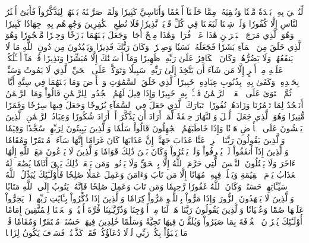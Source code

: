 لِّنُحۡـِۧيَ بِهِۦ بَلۡدَةٗ مَّيۡتٗا وَنُسۡقِيَهُۥ مِمَّا خَلَقۡنَآ أَنۡعَٰمٗا وَأَنَاسِيَّ كَثِيرٗا
وَلَقَدۡ صَرَّفۡنَٰهُ بَيۡنَهُمۡ لِيَذَّكَّرُواْ فَأَبَىٰٓ أَكۡثَرُ ٱلنَّاسِ إِلَّا كُفُورٗا
وَلَوۡ شِئۡنَا لَبَعَثۡنَا فِي كُلِّ قَرۡيَةٖ نَّذِيرٗا
فَلَا تُطِعِ ٱلۡكَٰفِرِينَ وَجَٰهِدۡهُم بِهِۦ جِهَادٗا كَبِيرٗا
۞وَهُوَ ٱلَّذِي مَرَجَ ٱلۡبَحۡرَيۡنِ هَٰذَا عَذۡبٞ فُرَاتٞ وَهَٰذَا مِلۡحٌ أُجَاجٞ وَجَعَلَ بَيۡنَهُمَا بَرۡزَخٗا وَحِجۡرٗا مَّحۡجُورٗا
وَهُوَ ٱلَّذِي خَلَقَ مِنَ ٱلۡمَآءِ بَشَرٗا فَجَعَلَهُۥ نَسَبٗا وَصِهۡرٗاۗ وَكَانَ رَبُّكَ قَدِيرٗا
وَيَعۡبُدُونَ مِن دُونِ ٱللَّهِ مَا لَا يَنفَعُهُمۡ وَلَا يَضُرُّهُمۡۗ وَكَانَ ٱلۡكَافِرُ عَلَىٰ رَبِّهِۦ ظَهِيرٗا
وَمَآ أَرۡسَلۡنَٰكَ إِلَّا مُبَشِّرٗا وَنَذِيرٗا
قُلۡ مَآ أَسۡـَٔلُكُمۡ عَلَيۡهِ مِنۡ أَجۡرٍ إِلَّا مَن شَآءَ أَن يَتَّخِذَ إِلَىٰ رَبِّهِۦ سَبِيلٗا
وَتَوَكَّلۡ عَلَى ٱلۡحَيِّ ٱلَّذِي لَا يَمُوتُ وَسَبِّحۡ بِحَمۡدِهِۦۚ وَكَفَىٰ بِهِۦ بِذُنُوبِ عِبَادِهِۦ خَبِيرًا
ٱلَّذِي خَلَقَ ٱلسَّمَٰوَٰتِ وَٱلۡأَرۡضَ وَمَا بَيۡنَهُمَا فِي سِتَّةِ أَيَّامٖ ثُمَّ ٱسۡتَوَىٰ عَلَى ٱلۡعَرۡشِۖ ٱلرَّحۡمَٰنُ فَسۡـَٔلۡ بِهِۦ خَبِيرٗا
وَإِذَا قِيلَ لَهُمُ ٱسۡجُدُواْۤ لِلرَّحۡمَٰنِ قَالُواْ وَمَا ٱلرَّحۡمَٰنُ أَنَسۡجُدُ لِمَا تَأۡمُرُنَا وَزَادَهُمۡ نُفُورٗا۩
تَبَارَكَ ٱلَّذِي جَعَلَ فِي ٱلسَّمَآءِ بُرُوجٗا وَجَعَلَ فِيهَا سِرَٰجٗا وَقَمَرٗا مُّنِيرٗا
وَهُوَ ٱلَّذِي جَعَلَ ٱلَّيۡلَ وَٱلنَّهَارَ خِلۡفَةٗ لِّمَنۡ أَرَادَ أَن يَذَّكَّرَ أَوۡ أَرَادَ شُكُورٗا
وَعِبَادُ ٱلرَّحۡمَٰنِ ٱلَّذِينَ يَمۡشُونَ عَلَى ٱلۡأَرۡضِ هَوۡنٗا وَإِذَا خَاطَبَهُمُ ٱلۡجَٰهِلُونَ قَالُواْ سَلَٰمٗا
وَٱلَّذِينَ يَبِيتُونَ لِرَبِّهِمۡ سُجَّدٗا وَقِيَٰمٗا
وَٱلَّذِينَ يَقُولُونَ رَبَّنَا ٱصۡرِفۡ عَنَّا عَذَابَ جَهَنَّمَۖ إِنَّ عَذَابَهَا كَانَ غَرَامًا
إِنَّهَا سَآءَتۡ مُسۡتَقَرّٗا وَمُقَامٗا
وَٱلَّذِينَ إِذَآ أَنفَقُواْ لَمۡ يُسۡرِفُواْ وَلَمۡ يَقۡتُرُواْ وَكَانَ بَيۡنَ ذَٰلِكَ قَوَامٗا
وَٱلَّذِينَ لَا يَدۡعُونَ مَعَ ٱللَّهِ إِلَٰهًا ءَاخَرَ وَلَا يَقۡتُلُونَ ٱلنَّفۡسَ ٱلَّتِي حَرَّمَ ٱللَّهُ إِلَّا بِٱلۡحَقِّ وَلَا يَزۡنُونَۚ وَمَن يَفۡعَلۡ ذَٰلِكَ يَلۡقَ أَثَامٗا
يُضَٰعَفۡ لَهُ ٱلۡعَذَابُ يَوۡمَ ٱلۡقِيَٰمَةِ وَيَخۡلُدۡ فِيهِۦ مُهَانًا
إِلَّا مَن تَابَ وَءَامَنَ وَعَمِلَ عَمَلٗا صَٰلِحٗا فَأُوْلَـٰٓئِكَ يُبَدِّلُ ٱللَّهُ سَيِّـَٔاتِهِمۡ حَسَنَٰتٖۗ وَكَانَ ٱللَّهُ غَفُورٗا رَّحِيمٗا
وَمَن تَابَ وَعَمِلَ صَٰلِحٗا فَإِنَّهُۥ يَتُوبُ إِلَى ٱللَّهِ مَتَابٗا
وَٱلَّذِينَ لَا يَشۡهَدُونَ ٱلزُّورَ وَإِذَا مَرُّواْ بِٱللَّغۡوِ مَرُّواْ كِرَامٗا
وَٱلَّذِينَ إِذَا ذُكِّرُواْ بِـَٔايَٰتِ رَبِّهِمۡ لَمۡ يَخِرُّواْ عَلَيۡهَا صُمّٗا وَعُمۡيَانٗا
وَٱلَّذِينَ يَقُولُونَ رَبَّنَا هَبۡ لَنَا مِنۡ أَزۡوَٰجِنَا وَذُرِّيَّـٰتِنَا قُرَّةَ أَعۡيُنٖ وَٱجۡعَلۡنَا لِلۡمُتَّقِينَ إِمَامًا
أُوْلَـٰٓئِكَ يُجۡزَوۡنَ ٱلۡغُرۡفَةَ بِمَا صَبَرُواْ وَيُلَقَّوۡنَ فِيهَا تَحِيَّةٗ وَسَلَٰمًا
خَٰلِدِينَ فِيهَاۚ حَسُنَتۡ مُسۡتَقَرّٗا وَمُقَامٗا
قُلۡ مَا يَعۡبَؤُاْ بِكُمۡ رَبِّي لَوۡلَا دُعَآؤُكُمۡۖ فَقَدۡ كَذَّبۡتُمۡ فَسَوۡفَ يَكُونُ لِزَامَۢا